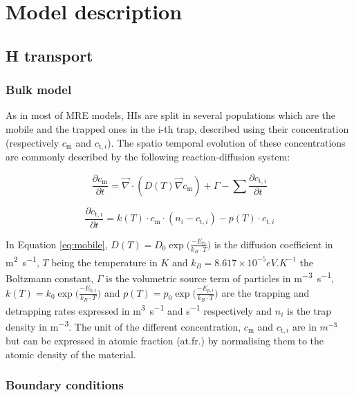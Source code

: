 \chapter{Model description}
\label{Chapter2} %
\section{H transport} \label{description_H_transport_model}
\subsection{Bulk model}
As in most of MRE models, HIs are split in several populations which are the mobile and the trapped ones in the i-th trap, described using their concentration (respectively $c_\mathrm{m}$ and $c_{\mathrm{t},i}$).
The spatio temporal evolution of these concentrations are commonly described by the following reaction-diffusion system:

\begin{equation}
    \frac{\partial c_\mathrm{m}}{\partial t}=\vec{\nabla} \cdot\left(D(T) \vec{\nabla}c_\mathrm{m}\right)+\Gamma-\sum \frac{\partial c_{\mathrm{t}, i}}{\partial t}
    \label{eq:mobile}
\end{equation}

\begin{equation}
    \frac{\partial c_{\mathrm{t}, i}}{\partial t}=k(T) \cdot c_\mathrm{m} \cdot\left(n_{i}-c_{\mathrm{t}, i}\right)-p(T) \cdot c_{\mathrm{t}, i}
    \label{eq:trapped}
\end{equation}

In Equation \ref{eq:mobile}, ${D(T)=D_0 \exp\big(\frac{-E_\mathrm{D}}{k_B \cdot T}\big)}$ is the diffusion coefficient in \si{m^2.s^{-1}}, $T$ being the temperature in $\si{K}$ and ${k_B = 8.617 \times 10^{-5} \si{eV.K^{-1}}}$ the Boltzmann constant, $\Gamma$ is the volumetric source term of particles in \si{m^{-3}.s^{-1}}, $k(T)=k_0\exp{\big(\frac{-E_{k, i}}{k_B \cdot T}\big)}$ and $p(T)=p_0\exp{\big(\frac{-E_{p, i}}{k_B \cdot T}\big)}$ are the trapping and detrapping rates expressed in \si{m^3.s^{-1}} and \si{s^{-1}} respectively and $n_i$ is the trap density in \si{m^{-3}}.
The unit of the different concentration, $c_\mathrm{m}$ and $c_{\mathrm{t},i}$ are in $ \si{m^{-3}}$ but can be expressed in atomic fraction (at.fr.) by normalising them to the atomic density of the material.
\subsection{Boundary conditions}


